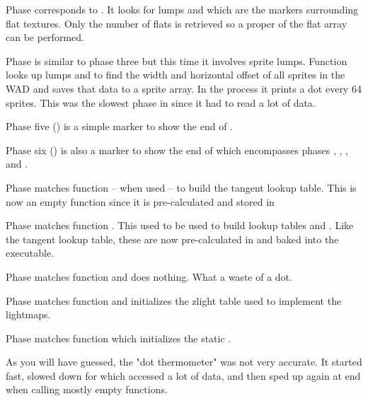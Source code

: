 Phase  corresponds to . It looks for lumps  and  which are the markers surrounding flat textures. Only the number of flats is retrieved so a proper  of the flat array can be performed.\\
\par

Phase  is similar to phase three but this time it involves sprite lumps. Function  looks up lumps  and  to find the width and horizontal offset of all sprites in the WAD and saves that data to a sprite array. In the process it prints a dot every 64 sprites. This was the slowest phase in  since it had to read a lot of data.\\
\par

Phase five () is a simple marker to show the end of .\\
\par

Phase six () is also a marker to show the end of  which encompasses phases , , , and .\\
\par

Phase  matches function  -- when used -- to build the tangent lookup table. This is now an empty function since it is pre-calculated and stored in \\
\par

Phase  matches function . This used to be used to build lookup tables  and . Like the tangent lookup table, these are now pre-calculated in  and baked into the executable.\\
\par

Phase  matches function  and does nothing. What a waste of a dot.\\
\par

Phase  matches function  and initializes the zlight table used to implement the lightmaps.\\
\par

Phase  matches function  which initializes the static .\\
\par
As you will have guessed, the "dot thermometer" was not very accurate. It started fast, slowed down for  which accessed a lot of data, and then sped up again at end when calling mostly empty functions.\\
\par
